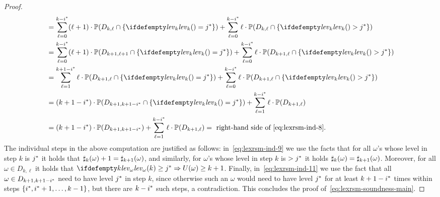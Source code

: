 \begin{proof}
\begin{align}
&= \sum_{\ell=0}^{k-\fixn{i}}(\ell+1) \cdot\probm(D_{k,\ell}\cap \{\levelrank{}{k} = \fixn{j}\}) +  \sum_{\ell=0}^{k-\fixn{i}} \ell\cdot\probm(D_{k,\ell}\cap \{\levelrank{}{k}>\fixn{j}\} ) \nonumber\\
&=\sum_{\ell=0}^{k-\fixn{i}} (\ell+1)\cdot \probm{(D_{k+1,\ell+1} \cap \{\levelrank{}{k} = \fixn{j}\})} +  \sum_{\ell=0}^{k-\fixn{i}} \ell\cdot\probm(D_{k+1,\ell}\cap \{\levelrank{}{k}>\fixn{j}\} ) \label{eq:lexrsm-ind-9}\\
&= \sum_{\ell=1}^{k+1-\fixn{i}} \ell\cdot \probm{(D_{k+1,\ell} \cap \{\levelrank{}{k} = \fixn{j}\})} +  \sum_{\ell=0}^{k-\fixn{i}} \ell\cdot\probm(D_{k+1,\ell}\cap \{\levelrank{}{k}>\fixn{j}\} )
   \nonumber \\
&= (k+1-\fixn{i})\cdot \probm{(D_{k+1,k+1-\fixn{i}}\cap\{\levelrank{}{k} =\fixn{j} \} )} + \sum_{\ell=1}^{k-\fixn{i}} \ell \cdot \probm(D_{k+1,\ell})  \nonumber\\
&= (k+1-\fixn{i})\cdot\probm(D_{k+1,k+1-\fixn{i}}) + \sum_{\ell=1}^{k-\fixn{i}}\ell\cdot\probm(D_{k+1,\ell}) = \text{ right-hand side of~\eqref{eq:lexrsm-ind-8}} \label{eq:lexrsm-ind-11}.
\end{align}
The individual steps in the above computation are justified as follows: in~\eqref{eq:lexrsm-ind-9} we use the facts that for all $\omega$'s whose level in step $k$ is ${j}^*$ it holds that $\sharp_k(\omega)+1=\sharp_{k+1}(\omega)$, and similarly, for $\omega$'s whose level in step $k$ is $>{j}^*$ it holds $\sharp_k(\omega)=\sharp_{k+1}(\omega)$. Moreover, for all $\omega\in D_{k,\ell}$ it holds that $\levelrank{k}{\omega}\geq \fixn{j} \Rightarrow U(\omega)\geq k+1$. Finally, in~\eqref{eq:lexrsm-ind-11} we use the fact that all $\omega\in D_{k+1,k+1-{i}^*}$ need to have level ${j}^*$ in step $k$, since otherwise such an $\omega$ would need to have level ${j}^*$ for at least $k+1-{i}^*$ times within steps $\{{i}^*,{i}^*+1,\dots,k-1\}$, but there are $k-{i}^*$ such steps, a contradiction. This concludes the proof of~\eqref{eq:lexrsm-soundness-main}.


\end{proof}

